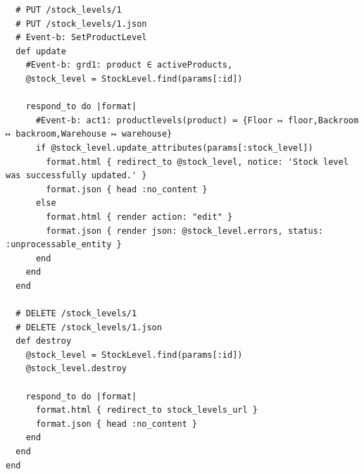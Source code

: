 \documentclass[a4paper]{article}
\begin{document}
\begin{verbatim}
  # PUT /stock_levels/1
  # PUT /stock_levels/1.json
  # Event-b: SetProductLevel
  def update
    #Event-b: grd1: product ∈ activeProducts, 
    @stock_level = StockLevel.find(params[:id])

    respond_to do |format|
      #Event-b: act1: productlevels(product) ≔ {Floor ↦ floor,Backroom ↦ backroom,Warehouse ↦ warehouse}
      if @stock_level.update_attributes(params[:stock_level])
        format.html { redirect_to @stock_level, notice: 'Stock level was successfully updated.' }
        format.json { head :no_content }
      else
        format.html { render action: "edit" }
        format.json { render json: @stock_level.errors, status: :unprocessable_entity }
      end
    end
  end

  # DELETE /stock_levels/1
  # DELETE /stock_levels/1.json
  def destroy
    @stock_level = StockLevel.find(params[:id])
    @stock_level.destroy

    respond_to do |format|
      format.html { redirect_to stock_levels_url }
      format.json { head :no_content }
    end
  end
end

\end{verbatim}
\end{document}
